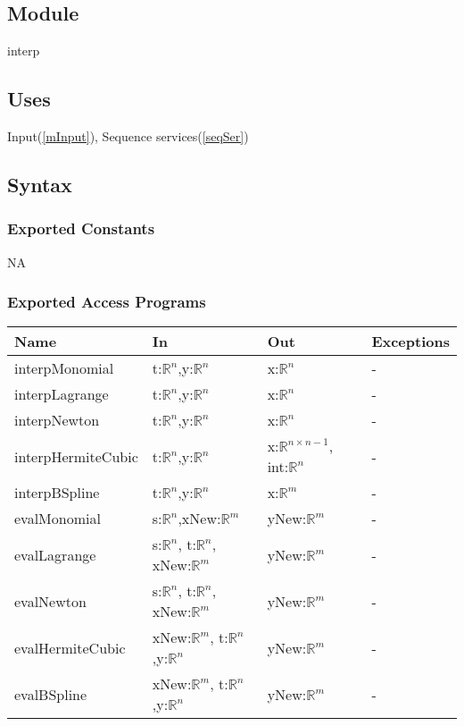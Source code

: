 \documentclass[12pt, titlepage]{article}
\begin{document}
\subsection{Module}

interp

\subsection{Uses}

Input(\ref{mInput}), Sequence services(\ref{seqSer})


\subsection{Syntax}

\subsubsection{Exported Constants}


NA

\subsubsection{Exported Access Programs}

\begin{center}
\begin{tabular}{p{4cm} p{4cm} p{6cm} p{1cm}}
\hline
\textbf{Name} & \textbf{In} & \textbf{Out} & \textbf{Exceptions} \\
\hline
interpMonomial & t:$\mathbb{R}^n$,y:$\mathbb{R}^n$  & x:$\mathbb{R}^n$ & - \\
interpLagrange & t:$\mathbb{R}^n$,y:$\mathbb{R}^n$ & x:$\mathbb{R}^n$ & - \\
interpNewton & t:$\mathbb{R}^n$,y:$\mathbb{R}^n$ & x:$\mathbb{R}^n$ & - \\
interpHermiteCubic & t:$\mathbb{R}^n$,y:$\mathbb{R}^n$ & x:$\mathbb{R}^{n 
\times n-1}$, int:$\mathbb{R}^{n}$ & 
- \\
interpBSpline & t:$\mathbb{R}^n$,y:$\mathbb{R}^n$ & x:$\mathbb{R}^{m}$ & - \\

evalMonomial & s:$\mathbb{R}^n$,xNew:$\mathbb{R}^m$  & 
yNew:$\mathbb{R}^m$  & - 
\\
evalLagrange & s:$\mathbb{R}^n$, t:$\mathbb{R}^n$, xNew:$\mathbb{R}^m$ & 
yNew:$\mathbb{R}^m$ & - \\
evalNewton & s:$\mathbb{R}^n$, t:$\mathbb{R}^n$, xNew:$\mathbb{R}^m$ & 
yNew:$\mathbb{R}^m$ & - \\
evalHermiteCubic &  xNew:$\mathbb{R}^m$, t:$\mathbb{R}^n$,y:$\mathbb{R}^n$ & 
yNew:$\mathbb{R}^m$ & - 
\\
evalBSpline & xNew:$\mathbb{R}^m$, t:$\mathbb{R}^n$,y:$\mathbb{R}^n$  
& yNew:$\mathbb{R}^m$ & - \\
\hline
\end{tabular}
\end{center}
\end{document}

